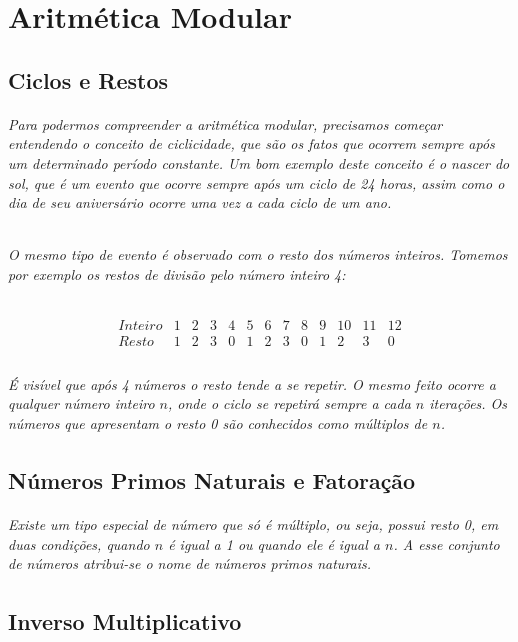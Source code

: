 \chapter {Aritm\'{e}tica Modular}
\label{Mod}

\section{Ciclos e Restos}	
\subparagraph{
Para podermos compreender a aritm\'etica modular, precisamos come\c{c}ar entendendo o conceito de ciclicidade, que s\~ao os fatos que ocorrem sempre ap\'os um determinado per\'iodo constante. Um bom exemplo deste conceito \'e o nascer do sol, que \'e um evento que ocorre sempre ap\'os um ciclo de {24} horas, assim como o dia de seu anivers\'ario ocorre uma vez a cada ciclo de um ano.
}
\subparagraph{
O mesmo tipo de evento \'e observado com o resto dos n\'umeros inteiros. Tomemos por exemplo os restos de divis\~ao pelo n\'umero inteiro {4}:
}

\[
\begin{array}{ccccccccccccc}
  {Inteiro} & 1 & 2 & 3 & 4 & 5 & 6 & 7 & 8 & 9 & 10 &  11 & 12 \\  
	{Resto} & 1 & 2 & 3 & 0 & 1 & 2 & 3 & 0 & 1 & 2  &  3 & 0 \\ 
\end{array}
\]

\subparagraph{
\'E vis\'ivel que ap\'os {4} n\'umeros o resto tende a se repetir. O mesmo feito ocorre a qualquer n\'umero inteiro $n$, onde o ciclo se repetir\'a sempre a cada $n$ itera\c{c}\~oes. Os n\'umeros que apresentam o resto {0} s\~ao conhecidos como m\'ultiplos de $n$.
}

\section{N\'{u}meros Primos Naturais e Fatora\c{c}\~{a}o}

\subparagraph{
Existe um tipo especial de n\'umero que s\'o \'e m\'ultiplo, ou seja, possui resto {0}, em duas condi\c{c}\~oes, quando $n$ \'e igual a {1} ou quando ele \'e igual a $n$. A esse conjunto de n\'umeros atribui-se o nome de \textit{n\'umeros primos naturais}.
}
\section{Inverso Multiplicativo}
